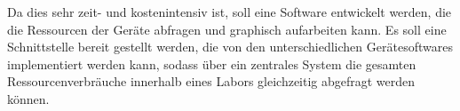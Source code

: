 Da dies sehr zeit- und kostenintensiv ist, soll eine Software entwickelt werden, die die Ressourcen der Geräte abfragen und graphisch aufarbeiten kann. Es soll eine Schnittstelle bereit gestellt werden, die von den unterschiedlichen Gerätesoftwares implementiert werden kann, sodass über ein zentrales System die gesamten Ressourcenverbräuche innerhalb eines Labors gleichzeitig abgefragt werden können.